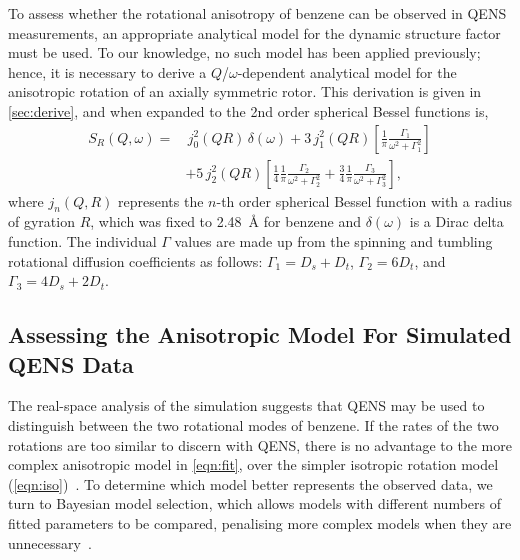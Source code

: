 \documentclass[reprint,
               superscriptaddress,
               nobibnotes,
               amsmath,
               amssymb,
               aps,
               hidelinks, 
               pre]{revtex4-2}
\begin{document}
To assess whether the rotational anisotropy of benzene can be observed in QENS measurements, an appropriate analytical model for the dynamic structure factor must be used. 
To our knowledge, no such model has been applied previously; hence, it is necessary to derive a $Q$/$\omega$-dependent analytical model for the anisotropic rotation of an axially symmetric rotor. 
This derivation is given in \ref{sec:derive}, and when expanded to the 2nd order spherical Bessel functions is,
%
\begin{equation}
\begin{aligned}
S_R(Q, \omega) = & \,
j_0^2(QR)\,\delta(\omega) + 3\,j_1^2(QR)
\left[
\frac{1}{\pi}
\frac{\Gamma_1}{\omega^2 + \Gamma_1^2}
\right] \\ 
 & + 5\,j_2^2(QR)
\left[
\frac{1}{4}
\frac{1}{\pi}
\frac{\Gamma_2}{\omega^2 + \Gamma_2^2} 
+
\frac{3}{4}
\frac{1}{\pi}
\frac{\Gamma_3}{\omega^2 + \Gamma_3^2}
\right],
\label{eqn:fit}
\end{aligned}
\end{equation}
%
where $j_n(Q,R)$ represents the $n$-th order spherical Bessel function with a radius of gyration $R$, which was fixed to \qty{2.48}{\angstrom} for benzene and $\delta(\omega)$ is a Dirac delta function. 
The individual $\Gamma$ values are made up from the spinning and tumbling rotational diffusion coefficients as follows: $\Gamma_1 = D_s + D_t$, $\Gamma_2 = 6D_t$, and $\Gamma_3 = 4D_s + 2D_t$.

\subsection*{Assessing the Anisotropic Model For Simulated QENS Data}
\label{sec:dynamic}

The real-space analysis of the simulation suggests that QENS may be used to distinguish between the two rotational modes of benzene.
If the rates of the two rotations are too similar to discern with QENS, there is no advantage to the more complex anisotropic model in \cref{eqn:fit}, over the simpler isotropic rotation model (\cref{eqn:iso})~\cite{Bee1988}. 
To determine which model better represents the observed data, we turn to Bayesian model selection, which allows models with different numbers of fitted parameters to be compared, penalising more complex models when they are unnecessary~\cite{Sivia1992, Sivia2006, McCluskey2020}. 
\end{document}
